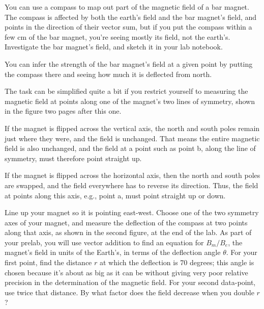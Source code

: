 \label{lab:magnetism}

\label{fig:dipbofr}

\apparatus
{}


\introduction

You can use a compass to map out part of the magnetic
field of a bar magnet. The compass is affected by
both the earth's field and the bar magnet's field, and
points in the direction of their vector sum, but if you put the
compass within a few cm of the bar magnet, you're seeing mostly
its field, not the earth's. Investigate the bar magnet's field,
and sketch it in your lab notebook.

You can infer the strength of the bar magnet's field at a
given point by putting the compass there and seeing how
much it is deflected from north.

The task can be simplified quite a bit if you restrict
yourself to measuring the magnetic field at points along one
of the magnet's two lines of symmetry, shown in the figure two pages after this one.


If the magnet is flipped across the vertical axis, the north
and south poles remain just where they were, and the field
is unchanged. That means the entire magnetic field is also
unchanged, and the field at a point such as point b, along
the line of symmetry, must therefore point straight up.

If the magnet is flipped across the horizontal axis, then
the north and south poles are swapped, and the field
everywhere has to reverse its direction. Thus, the field at
points along this axis, e.g., point a, must point straight up or down.

Line up your magnet so it is pointing east-west. Choose one
of the two symmetry axes of your magnet, and measure the
deflection of the compass at two points along that axis,
as shown in the second figure, at the end of the lab.
As part of your prelab, you will use vector addition to find an equation
for $B_m/B_e$, the magnet's field in units of the Earth's, in terms
of the deflection angle $\theta$. For your first point, find the
distance $r$ at which the deflection is 70 degrees; this angle is chosen because
it's about as big as it can be without giving very poor relative precision 
in the determination of the magnetic field. For your second data-point,
use twice that distance. By what factor does the field decrease
when you double $r$?


